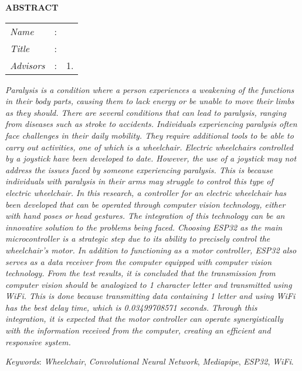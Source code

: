 \begin{center}
  \large\textbf{ABSTRACT}
\end{center}


\vspace{2ex}

\begingroup
\setlength{\tabcolsep}{0pt}

\noindent
\begin{tabularx}{\textwidth}{l >{\centering}m{3em} X}
  \emph{Name}     & : & \name{}         \\

  \emph{Title}    & : & \engtatitle{}   \\

  \emph{Advisors} & : & 1. \advisor{}   \\
\end{tabularx}
\endgroup

\emph{Paralysis is a condition where a person experiences a weakening of the functions in their body parts, causing them to lack energy or be unable to move their limbs as they should. There are several conditions that can lead to paralysis, ranging from diseases such as stroke to accidents. Individuals experiencing paralysis often face challenges in their daily mobility. They require additional tools to be able to carry out activities, one of which is a wheelchair. Electric wheelchairs controlled by a joystick have been developed to date. However, the use of a joystick may not address the issues faced by someone experiencing paralysis. This is because individuals with paralysis in their arms may struggle to control this type of electric wheelchair. In this research, a controller for an electric wheelchair has been developed that can be operated through computer vision technology, either with hand poses or head gestures. The integration of this technology can be an innovative solution to the problems being faced. Choosing ESP32 as the main microcontroller is a strategic step due to its ability to precisely control the wheelchair's motor. In addition to functioning as a motor controller, ESP32 also serves as a data receiver from the computer equipped with computer vision technology. From the test results, it is concluded that the transmission from computer vision should be analogized to 1 character letter and transmitted using WiFi. This is done because transmitting data containing 1 letter and using WiFi has the best delay time, which is 0.03499708571 seconds. Through this integration, it is expected that the motor controller can operate synergistically with the information received from the computer, creating an efficient and responsive system.}

\emph{Keywords}: \emph{Wheelchair}, \emph{Convolutional Neural Network}, \emph{Mediapipe}, \emph{ESP32}, \emph{WiFi}.
